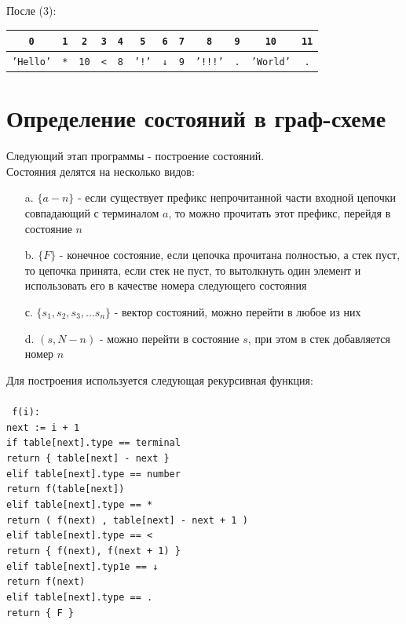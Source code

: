\documentclass[12pt]{article}
\newcommand\tab[1][1cm]{\hspace*{#1}}
\begin{document}
После (3):\\
\tab\begin{tabular}{|c|c|c|c|c|c|c|c|c|c|c|c|}
\hline
\texttt{0} & \texttt{1} & \texttt{2} & \texttt{3} & \texttt{4} & \texttt{5} & \texttt{6} & \texttt{7} & \texttt{8} & \texttt{9} & \texttt{10} & \texttt{11}\\
\hline
\texttt{'Hello'} & \texttt{*} & \texttt{10} & \texttt{<} & \texttt{8} & \texttt{'!'} & \texttt{↓} & \texttt{9} & \texttt{'!!!'} & \texttt{.} & \texttt{'World'} & \texttt{.}\\
\hline
\end{tabular}
\section{Определение состояний в граф-схеме}
Следующий этап программы - построение состояний. \\
Состояния делятся на несколько видов:\\
\begin{enumerate}
\item[a.] $\{ a - n \}$ - если существует префикс непрочитанной части входной цепочки совпадающий с терминалом $a$, то можно прочитать этот префикс, перейдя в состояние $n$
\item[b.] $\{ F \}$ - конечное состояние, если цепочка прочитана полностью, а стек пуст, то цепочка принята, если стек не пуст, то вытолкнуть один элемент и использовать его в качестве номера следующего состояния
\item[с.] $\{ s_1, s_2, s_3, ... s_n\}$ - вектор состояний, можно перейти в любое из них
\item[d.] $( s, N - n )$ - можно перейти в состояние $s$, при этом в стек добавляется номер $n$ 
\end{enumerate}
Для построения используется следующая рекурсивная функция:\\
\\
\texttt{
\tab f(i):\\
\tab  \tab next := i + 1\\
\tab \tab if\ table[next].type == terminal\\
\tab  \tab \tab return \{ table[next] - next \}\\
\tab  \tab elif\ table[next].type == number\\
\tab  \tab \tab return f(table[next])\\
\tab  \tab elif\ table[next].type == *\\
\tab \tab \tab return ( f(next) , table[next] - next + 1 )\\
\tab  \tab elif\ table[next].type == <\\
\tab  \tab \tab return \{ f(next), f(next + 1) \}\\
\tab  \tab elif\ table[next].typ1e == ↓\\
\tab  \tab \tab return f(next)\\
\tab  \tab elif\ table[next].type == .\\
\tab  \tab \tab return \{ F \}\\
}
\end{document}
